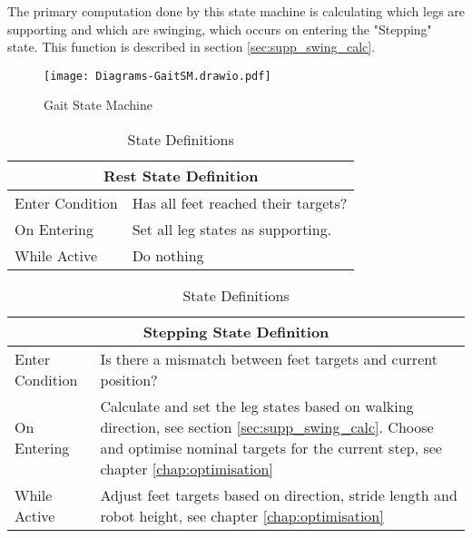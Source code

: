        The primary computation done by this state machine is calculating which legs are supporting and which are swinging, which occurs
        on entering the "Stepping" state. This function is described in section \ref{sec:supp_swing_calc}.

        \begin{figure}[h]
            \centering
            \texttt{[image: Diagrams-GaitSM.drawio.pdf]}
            \caption{Gait State Machine}
            \label{fig:gaitSM}
        \end{figure}

        \begin{table}[h]
            \center
            \begin{tabularx}{\textwidth}{|l|X|}
                \hline
                \multicolumn{2}{|c|}{Rest State Definition} \\
                \hline
                Enter Condition & Has all feet reached their targets? \\
                \hline
                On Entering & Set all leg states as supporting. \\
                \hline
                While Active & Do nothing \\
                \hline
            \end{tabularx}
            
            \bigskip
            \noindent
            \begin{tabularx}{\textwidth}{|l|X|}
                \hline
                \multicolumn{2}{|c|}{Stepping State Definition} \\
                \hline
                Enter Condition & Is there a mismatch between feet targets and current position? \\
                \hline
                On Entering & Calculate and set the leg states based on walking direction, see section \ref{sec:supp_swing_calc}. Choose and optimise nominal targets
                for the current step, see chapter \ref{chap:optimisation}\\
                \hline
                While Active & Adjust feet targets based on direction, stride length and robot height, see chapter \ref{chap:optimisation}\\
                \hline
            \end{tabularx}
            \caption{State Definitions}
            \label{tab:state_defs}
        \end{table}

